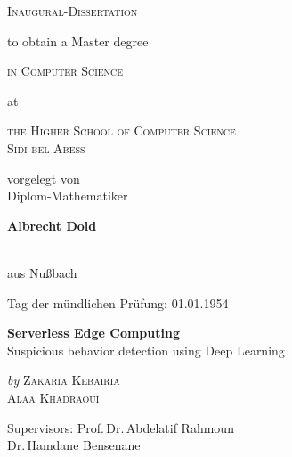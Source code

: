 
\begin{titlepage}
	\begin{center}
		\textsc{\huge Inaugural-Dissertation}
                \vskip 1cm
                \begin{large}
                  to obtain a Master degree\\[0.50cm]
                  \begin{Large}
                    \textsc{in Computer Science}\\[0.50cm]
                  \end{Large}
                  at\\[0.50cm]
                  \begin{Large}
                    \textsc{the Higher School of Computer Science\\Sidi bel Abess}\par
                  \end{Large}
                \end{large}
		\vfill
		\begin{large}
                  vorgelegt von\\
                  Diplom-Mathematiker\\[0.5cm]
                  \begin{LARGE}
                    \textbf{Albrecht Dold}
                  \end{LARGE}\\[0.5cm]
                  aus Nu{\ss}bach
		\end{large}
    \vskip 1cm
    \begin{small}
      Tag der mündlichen Prüfung: 01.01.1954
    \end{small}
	\end{center}
\end{titlepage}


\begin{titlepage}
  \phantom{}
  \vfill 
  \begin{center}
    \begin{singlespace*}
      \begin{Huge}
          \textbf{Serverless Edge Computing}\\
          Suspicious behavior detection using Deep Learning\par
      \end{Huge}
      \vskip 0.25cm
      \emph{by}
      \vskip 0.25cm
      \textsc{Zakaria Kebairia\\
              Alaa Khadraoui}\par
    \end{singlespace*}
  \end{center}
  \vfill
  \begin{singlespace*}
    Supervisors:            Prof.\,Dr.\,Abdelatif Rahmoun\\
    \phantom{Supervisors:}  Dr.\,Hamdane Bensenane
  \end{singlespace*}
\end{titlepage}

\newpage
\null
\thispagestyle{empty}
\newpage

